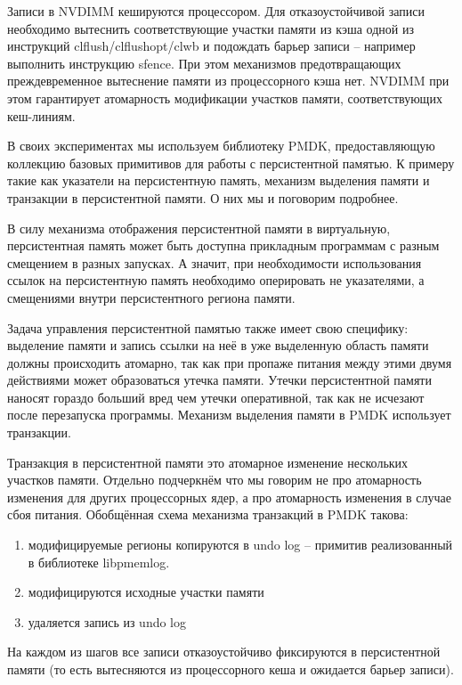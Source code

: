 \documentclass[pdftex,ptm,12pt,a4paper]{report}
\theoremstyle{definition}
\begin{document}
Записи в NVDIMM кешируются процессором. Для отказоустойчивой записи необходимо вытеснить соответствующие участки памяти из кэша одной из инструкций clflush/clflushopt/clwb
и подождать барьер записи -- например выполнить инструкцию sfence. При этом механизмов предотвращающих преждевременное вытеснение памяти из процессорного кэша нет.
NVDIMM при этом гарантирует атомарность модификации участков памяти, соответствующих кеш-линиям.

В своих экспериментах мы используем библиотеку PMDK, предоставляющую коллекцию базовых примитивов для работы с персистентной памятью.
К примеру такие как указатели на персистентную память, механизм выделения памяти и транзакции в персистентной памяти. О них мы и поговорим подробнее.

В силу механизма отображения персистентной памяти в виртуальную, персистентная память может быть доступна прикладным программам с разным смещением в разных запусках.
А значит, при необходимости использования ссылок на персистентную память необходимо оперировать не указателями, а смещениями внутри персистентного региона памяти.

\label{allocations}
Задача управления персистентной памятью также имеет свою специфику: выделение памяти и запись ссылки на неё в уже выделенную область памяти должны происходить атомарно, так как
при пропаже питания между этими двумя действиями может образоваться утечка памяти. Утечки персистентной памяти наносят гораздо больший вред чем утечки оперативной,
так как не исчезают после перезапуска программы. Механизм выделения памяти в PMDK использует транзакции.

Транзакция в персистентной памяти это атомарное изменение нескольких участков памяти. Отдельно подчеркнём что мы говорим не про атомарность изменения для других процессорных ядер, а
про атомарность изменения в случае сбоя питания.
Обобщённая схема механизма транзакций в PMDK такова:
\begin{enumerate}
    \item модифицируемые регионы копируются в undo log -- примитив реализованный в библиотеке libpmemlog.
    \item модифицируются исходные участки памяти
    \item удаляется запись из undo log
\end{enumerate}
На каждом из шагов все записи отказоустойчиво фиксируются в персистентной памяти (то есть вытесняются из процессорного кеша и ожидается барьер записи).
\end{document}

